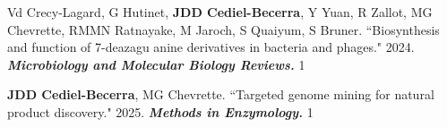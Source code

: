 \begin{cvpubs}


\cvpub
{Vd Crecy-Lagard, G Hutinet, \textbf{JDD Cediel-Becerra}, Y Yuan, R Zallot, MG Chevrette, RMMN Ratnayake, M Jaroch, S Quaiyum, S Bruner. ``Biosynthesis and function of 7-deazagu
anine derivatives in bacteria and phages." 2024. \textit{\textbf{Microbiology and Molecular Biology Reviews.}}\textit{\textbf{}}}
{1}

\end{cvpubs}



 \vspace{-2mm}

\begin{cvpubs}


\cvpub
{\textbf{JDD Cediel-Becerra}, MG Chevrette. ``Targeted genome mining for natural product discovery." 2025. \textit{\textbf{Methods in Enzymology.}} \textit{\textbf{}}}
{1}

\end{cvpubs}








 \vspace{-2mm}

